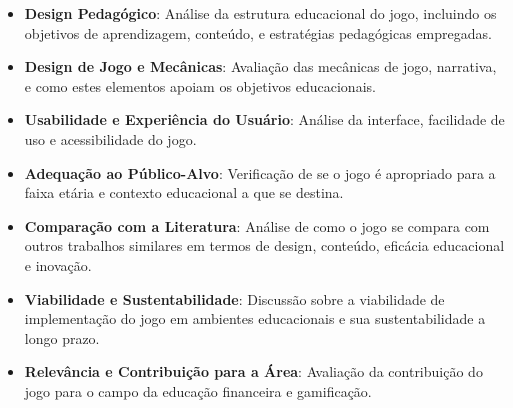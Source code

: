 \begin{itemize}
	\item \textbf{Design Pedagógico}: Análise da estrutura educacional do jogo, incluindo os objetivos de aprendizagem, conteúdo, e estratégias pedagógicas empregadas.
	\item \textbf{Design de Jogo e Mecânicas}: Avaliação das mecânicas de jogo, narrativa, e como estes elementos apoiam os objetivos educacionais.
	\item \textbf{Usabilidade e Experiência do Usuário}: Análise da interface, facilidade de uso e acessibilidade do jogo.
	\item \textbf{Adequação ao Público-Alvo}: Verificação de se o jogo é apropriado para a faixa etária e contexto educacional a que se destina.
	\item \textbf{Comparação com a Literatura}: Análise de como o jogo se compara com outros trabalhos similares em termos de design, conteúdo, eficácia educacional e inovação.
	\item \textbf{Viabilidade e Sustentabilidade}: Discussão sobre a viabilidade de implementação do jogo em ambientes educacionais e sua sustentabilidade a longo prazo.
	\item \textbf{Relevância e Contribuição para a Área}: Avaliação da contribuição do jogo para o campo da educação financeira e gamificação.
\end{itemize}
